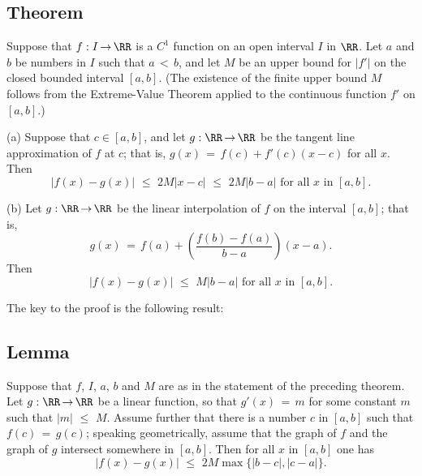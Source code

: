 \V

             \subsection{\small{\bf Theorem}}
            \label{ThmE55.40}

\V

        Suppose that $f:I \,{\rightarrow}\, {\RR}$ is a $C^{1}$ function on an open interval $I$ in ${\RR}$.
    Let $a$ and $b$ be numbers in $I$ such that $a\,<\,b$, and let $M$ be an upper bound for $|f'|$ on the closed bounded interval $[a,b]$.
    (The existence of the finite upper bound $M$ follows from the Extreme-Value Theorem applied to the continuous function $f'$ on $[a,b]$.)

\V

        (a) Suppose that $c{\in}[a,b]$, and let $g:{\RR} \,{\rightarrow}\, {\RR}$ be the tangent line approximation of $f$ at $c$;
    that is, $g(x) \,=\, f(c) + f'(c)(x-c)$ for all $x$.
    Then
        \begin{equation}
        \label{EqnE.250A}
        |f(x)-g(x)|\,\,{\leq}\,\,2M|x-c|\,\,{\leq}\,\,2M|b-a| \mbox{ for all $x$ in $[a,b]$}.
        \end{equation}

\V

        (b) Let $g:{\RR} \,{\rightarrow}\, {\RR}$ be the linear interpolation of $f$ on the interval $[a,b]$;
    that is,
        \begin{displaymath}
        g(x) \,=\, f(a) + \left(\frac{f(b)-f(a)}{b-a}\right)(x-a).
        \end{displaymath}
    Then
        \begin{equation}
        \label{EqnE.250B}
        |f(x)-g(x)|\,\,{\leq}\,\,M|b-a| \mbox{ for all $x$ in $[a,b]$}.
        \end{equation}

\V

        The key to the proof is the following result:

\V

             \subsection{\small{\bf Lemma}}
            \label{LemmaE55.45}

\V

        Suppose that $f$, $I$, $a$, $b$ and $M$ are as in the statement of the preceding theorem.
    Let $g:{\RR} \,{\rightarrow}\, {\RR}$ be a linear function, so that $g'(x) \,=\, m$ for some constant $m$ such that $|m|\,\,{\leq}\,\,M$.
    Assume further that there is a number $c$ in $[a,b]$ such that $f(c) \,=\, g(c)$;
    speaking geometrically, assume that the graph of $f$ and the graph of $g$ intersect somewhere in $[a,b]$.
    Then for all $x$ in $[a,b]$ one has
        \begin{displaymath}
        |f(x)-g(x)|\,\,{\leq}\,\,2M\max\{|b-c|, |c-a|\}.
        \end{displaymath}

